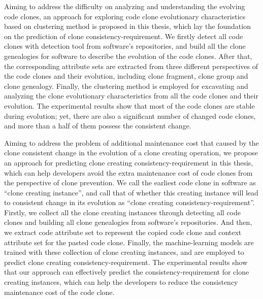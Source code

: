 {Aiming to address the difficulty on analyzing and understanding the evolving code clones, an approach for exploring code clone evolutionary characteristics based on clustering method is proposed in this thesis, which lay the foundation on the prediction of clone consistency-requirement.
We firstly detect all code clones with detection tool from software's repositories, and build all the clone genealogies for software to describe the evolution of the code clones.
After that, the corresponding attribute sets are extracted from three different perspectives of the code clones and their evolution, including clone fragment, clone group and clone genealogy. 
Finally, the clustering method is employed for excavating and analyzing the clone evolutionary characteristics from all the code clones and their evolution. 
The experimental results show that most of the code clones are stable during evolution; yet, there are also a significant number of changed code clones, and more than a half of them possess the consistent change.

Aiming to address the problem of additional maintenance cost that caused by the clone consistent change in the evolution of a clone creating operation, we propose an approach for predicting clone creating consistency-requirement in this thesis, which can help developers avoid the extra maintenance cost of code clones from the perspective of clone prevention.
We call the earliest code clone in software as ``clone creating instance'', and call that of whether this creating instance will lead to consistent change in its evolution as ``clone creating consistency-requirement''.
Firstly, we collect all the clone creating instances through detecting all code clones and building all clone genealogies from software's repositories.
And then, we extract code attribute set to represent the copied code clone and context attribute set for the pasted code clone.
Finally, the machine-learning models are trained with these collection of clone creating instances, and are employed to predict clone creating consistency-requirement. 
The experimental results show that our approach can effectively predict the consistency-requirement for clone creating instances, which can help the developers to reduce the consistency maintenance cost of the code clone.

}
